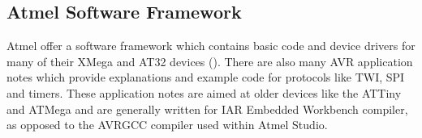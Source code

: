 \subsection{Atmel Software Framework}

Atmel offer a software framework which contains basic code and device drivers for many of their XMega and AT32 devices (\cite{Atmel:ASF}). There are also many AVR application notes which provide explanations and example code for protocols like TWI, SPI and timers. These application notes are aimed at older devices like the ATTiny and ATMega and are generally written for IAR Embedded Workbench compiler, as opposed to the AVRGCC compiler used within Atmel Studio. 

%
%
%
%
%


